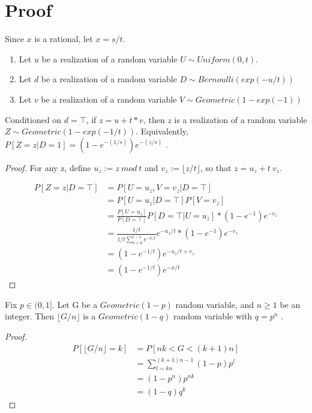 \documentclass{article}
\begin{document}
\section{Proof}
Since $x$ is a rational, let $x = s/t$. 

\begin{enumerate}
    \item Let $u$ be a realization of a random variable $U \sim Uniform(0, t)$.
    \item Let $d$ be a realization of a random variable $D \sim Bernoulli(exp(-u/t))$
    \item Let $v$ be a realization of a random variable $V \sim Geometric(1 - exp(-1))$
\end{enumerate}

\begin{lemma}
\label{geom_1_t}
Conditioned on $d = \top$, if $z = u + t * v$, then $z$ is a realization of a random variable $Z \sim Geometric(1 - exp(-1/t))$. Equivalently, $P[Z=z | D=1] = (1 - e^{-(1/s)}) e^{-(z/s)}$ \cite{CKS20}.
\end{lemma}

\begin{proof}
For any z, define $u_z := z \ mod \ t$ and $v_z := \lfloor z/t \rfloor$, so that $z = u_z + t \ v_z$. 

\begin{align*}
    P[Z=z | D=\top] &= P[U = u_z, V = v_z | D = \top] \\
    &= P[U = u_z | D = \top] P[V = v_z] \\
    &= \frac{P[U = u_z]}{P[D=\top]} P[D=\top | U = u_z] * (1 - e^{-1}) e^{-v_z} \\
    &= \frac{1/t}{1/t \sum_{k=0}^{t-1}e^{-k/t}} e^{-u_z/t} * (1 - e^{-1}) e^{-v_z} \\
    &= (1 - e^{-1/t}) e^{-u_z/t + v_z} \\
    &= (1 - e^{-1/t}) e^{-x/t}
\end{align*}
\end{proof}



\begin{lemma}
\label{divide_geometric}
Fix $p \in (0, 1]$. Let G be a $Geometric(1 - p)$ random variable, and $n \geq 1$ be an integer. Then $\lfloor G / n \rfloor$ is a $Geometric(1 - q)$ random variable with $q = p^n$ \cite{CKS20}.
\end{lemma}

\begin{proof}
\begin{align*}
    P[\lfloor G/n \rfloor = k] &= P[nk < G < (k + 1)n] \\
    &= \sum_{l=kn}^{(k+1)n - 1} (1 - p)p^l \\
    &= (1 - p^n)p^{nk} \\
    &= (1 - q)q^k
\end{align*}
\end{proof}
\end{document}

